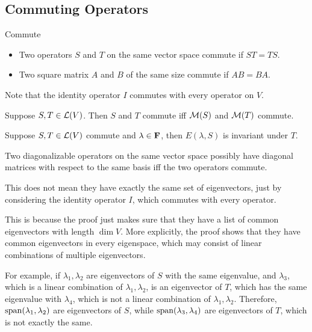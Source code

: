 \documentclass[12pt,a4paper]{article}
\begin{document}
    \subsection{Commuting Operators}
    \begin{defi}{Commute}
        \begin{itemize}
            \item Two operators $S$ and $T$ on the same vector space commute if $ST=TS$.
            \item Two square matrix $A$ and $B$ of the same size commute if $AB=BA$.
        \end{itemize}
    \end{defi}
    \begin{remark}
        Note that the identity operator $I$ commutes with every operator on $V$.
    \end{remark}
    \begin{prop}
        Suppose $S,T\in\mathcal{L}(V)$. Then $S$ and $T$ commute iff $\mathcal{M}(S)$ and $\mathcal{M}(T)$ commute.
    \end{prop}
    \hfill

    \begin{prop}
        Suppose $S,T\in\mathcal{L}(V)$ commute and $\lambda\in\mathbf{F}$, then $E(\lambda,S)$ is invariant under $T$.
    \end{prop}
    \hfill

    \begin{prop}
        Two diagonalizable operators on the same vector space possibly have diagonal matrices with respect to the same basis iff the two operators commute.
    \end{prop}
    \begin{remark}
        This does not mean they have exactly the same set of eigenvectors, just by considering the identity operator $I$, which commutes with every operator.
        
        This is because the proof just makes sure that they have a list of common eigenvectors with length $\dim V$. More explicitly, the proof shows that they have common eigenvectors in every eigenspace, which may consist of linear combinations of multiple eigenvectors.
        
        For example, if $\lambda_1,\lambda_2$ are eigenvectors of $S$ with the same eigenvalue, and $\lambda_3$, which is a linear combination of $\lambda_1,\lambda_2$, is an eigenvector of $T$, which has the same eigenvalue with $\lambda_4$, which is not a linear combination of $\lambda_1,\lambda_2$. Therefore, $\operatorname{span}(\lambda_1,\lambda_2)$ are eigenvectors of $S$, while $\operatorname{span}(\lambda_3,\lambda_4)$ are eigenvectors of $T$, which is not exactly the same.
    \end{remark}
    \hfill
\end{document}
